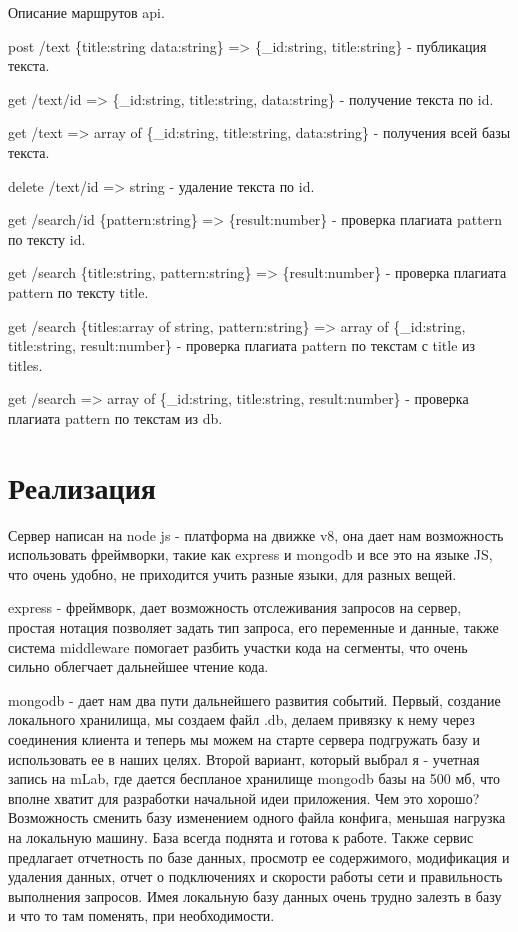 Описание маршрутов api.

post /text \{title:string data:string\} => \{\_id:string, title:string\} - публикация текста.

get /text/id => \{\_id:string, title:string, data:string\} - получение текста по id.

get /text => array of \{\_id:string, title:string, data:string\} - получения всей базы текста.

delete /text/id => string - удаление текста по id.

\vspace{10pt}

get /search/id \{pattern:string\} => \{result:number\} - проверка плагиата pattern по тексту id.

get /search \{title:string, pattern:string\} => \{result:number\} - проверка плагиата pattern по тексту title.

get /search \{titles:array of string, pattern:string\} => array of \{\_id:string, title:string, result:number\} - проверка плагиата pattern по текстам с title из titles.

get /search => array of \{\_id:string, title:string, result:number\} - проверка плагиата pattern по текстам из db.

\section*{Реализация}

Сервер написан на node js - платформа на движке v8, она дает нам возможность использовать фреймворки, такие как express и mongodb и все это на языке JS, что очень удобно, не приходится учить разные языки, для разных вещей.

express - фреймворк, дает возможность отслеживания запросов на сервер, простая нотация позволяет задать тип запроса, его переменные и данные, также система middleware помогает разбить участки кода на сегменты, что очень сильно облегчает дальнейшее чтение кода.

mongodb - дает нам два пути дальнейшего развития событий. Первый, создание локального хранилища, мы создаем файл .db, делаем привязку к нему через соединения клиента и теперь мы можем на старте сервера подгружать базу и использовать ее в наших целях.
Второй вариант, который выбрал я - учетная запись на mLab, где дается беспланое хранилище mongodb базы на 500 мб, что вполне хватит для разработки начальной идеи приложения. Чем это хорошо? Возможность сменить базу изменением одного файла конфига, меньшая нагрузка на локальную машину. База всегда поднята и готова к работе.
Также сервис предлагает отчетность по базе данных, просмотр ее содержимого, модификация и удаления данных, отчет о подключениях и скорости работы сети и правильность выполнения запросов. Имея локальную базу данных очень трудно залезть в базу и что то там поменять, при необходимости.

